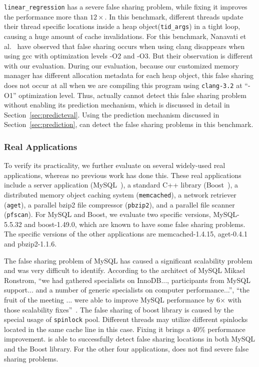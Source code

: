 \texttt{linear\_regression} has a severe false sharing problem, 
while fixing it improves the performance more than $12\times$.
In this benchmark, different threads update their thread specific locations 
inside a heap object(\texttt{tid\_args}) in a tight loop, 
causing a huge amount of cache invalidations. 
For this benchmark, Nanavati et al.~\cite{OSdetection} have observed that 
false sharing occurs when using clang
disappears when using gcc with optimization levels -O2 and -O3.  
But their observation is different with our evaluation. 
During our evaluation, because our customized memory manager has different allocation 
metadata for each heap object, this false sharing does not 
occur at all when we are compiling this program
using \texttt{clang-3.2} at ``-O1'' optimization level.
Thus, \Predator{} actually cannot detect this false sharing problem without enabling its
prediction mechanism, which is discussed in detail in Section~\ref{sec:predicteval}.
Using the prediction mechanism discussed in Section~\ref{sec:prediction},
\Predator{} can detect the false sharing problems in this benchmark.

\subsubsection{Real Applications}
To verify its practicality, we further evaluate \Predator{} 
on several widely-used real applications, whereas no previous work has done this.  
These real applications include a server application (MySQL~\cite{mysql}),
a standard C++ library (Boost~\cite{libfalsesharing}),
a distributed memory object caching system (\texttt{memcached}), a network retriever (\texttt{aget}),
a parallel bzip2 file compressor (\texttt{pbzip2}), and a parallel file scanner (\texttt{pfscan}).
For MySQL and Boost,
we evaluate two specific versions, MySQL-5.5.32 and
boost-1.49.0, which are known to have some false sharing problems.
The specific versions of the other applications are memcached-1.4.15,
aget-0.4.1 and {pbzip2-1.1.6}.

The false sharing problem of MySQL has caused a significant scalability problem and
was very difficult to identify.
According to the architect of MySQL Mikael Ronstrom, ``we had gathered specialists on 
InnoDB..., participants from MySQL support... and a number of generic specialists on 
computer performance...'', ``the fruit of the meeting ... were able to 
improve MySQL performance by 6$\times$ with those scalability fixes''~\cite{mysql}. 
The false sharing of boost library is caused by the special usage of \texttt{spinlock} pool.
Different threads may utilize different spinlocks located in the same cache line in this case.
Fixing it brings a 40\% performance improvement.
\Predator{} is able to successfully detect false sharing locations
in both MySQL and the Boost library. 
For the other four applications, \Predator{} does not find severe false sharing problems.

